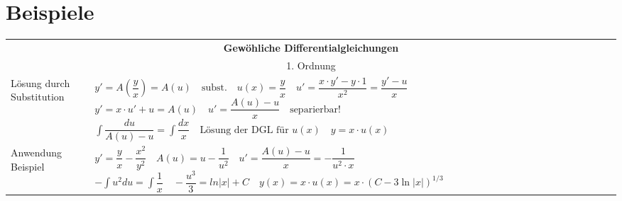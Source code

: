 \section{Beispiele}
 

\begin{tabularx}{\columnwidth}{p{2.5cm} X}
	\hline 
	\multicolumn{2}{c}{\textbf{Gewöhliche Differentialgleichungen }}\\
	\multicolumn{2}{c}{1. Ordnung}\\
	Lösung durch Substitution & 
	$y' = A\left(\dfrac{y}{x}\right) = A(u) \quad \text{subst.}\quad u(x) = \dfrac{y}{x} \quad u' = \dfrac{x\cdot y'-y\cdot1}{x^2} = \dfrac{y'-u}{x} $ \newline 
	$y' = x\cdot u' +u = A(u)  \quad u' = \dfrac{A(u)-u}{x} \quad \text{separierbar!}$ \newline 
	$\boxed{\int\dfrac{du}{A(u) - u} = \int \dfrac{dx}{x}} \quad \text{Lösung der DGL für } u(x) \quad y = x\cdot u(x)$\\
	Anwendung Beispiel&
	$y' = \dfrac{y}{x} - \dfrac{x^2}{y^2} \quad A(u) = u - \dfrac{1}{u^2} \quad u' = \dfrac{A(u) - u}{x} = -\dfrac{1}{u^2\cdot x} $\newline 
	$-\int u^2 du = \int \dfrac{1}{x} \quad -\dfrac{u^3}{3} = ln|x|+C \quad y(x) = x \cdot u(x) = x\cdot (C -3\ln|x| )^{1/3}$
	
	
	\\
\end{tabularx} 
